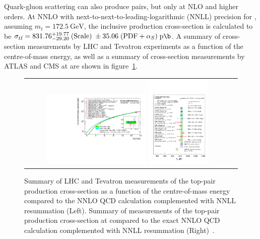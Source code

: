 Quark-gluon scattering can also produce \ttbar pairs, but only at NLO and higher orders.
At NNLO with next-to-next-to-leading-logarithmic (NNLL) precision for \beamenergy, assuming $m_t = \SI{172.5}{\GeV}$, the inclusive \ttbar production cross-section is calculated to be $\sigma_{\ttbar} = 831.76 \substack{+19.77 \\ -29.20} \; (\text{Scale}) \; \pm 35.06 \; (\text{PDF} + \alpha_S) \; \si{\pico \b}$.
A summary of \ttbar cross-section measurements by LHC and Tevatron experiments as a function of the centre-of-mass energy, as well as a summary of \ttbar cross-section measurements by ATLAS and CMS at \beamenergy are shown in figure~\ref{ttbar_cross-section}.
\begin{figure}[!h]
  \begin{center}
    \begin{tabular}{cc}
        \includegraphics[width=0.50\textwidth]{fig_TopQuark/tt_curve_toplhcwg_nov22.pdf}
        \includegraphics[width=0.30\textwidth]{fig_TopQuark/tt_xsec_13TeV_nov22.pdf}
    \end{tabular}
    \caption{Summary of LHC and Tevatron measurements of the top-pair production cross-section as a function of the centre-of-mass energy compared to the NNLO QCD calculation complemented with NNLL resummation (Left).
    Summary of measurements of the top-pair production cross-section at \beamenergy compared to the exact NNLO QCD calculation complemented with NNLL resummation (Right)~\cite{LHCTopWGSummaryPlots}.
            }
    \label{ttbar_cross-section}
  \end{center}
\end{figure}

